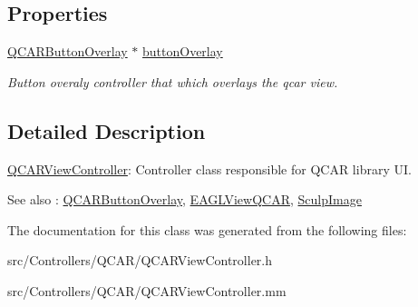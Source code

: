 \subsection*{\-Properties}
\begin{DoxyCompactItemize}
\item 
\hypertarget{interface_q_c_a_r_view_controller_a208c7f5c406cba73be4036a4e34a5715}{
\hyperlink{interface_q_c_a_r_button_overlay}{\-Q\-C\-A\-R\-Button\-Overlay} $\ast$ \hyperlink{interface_q_c_a_r_view_controller_a208c7f5c406cba73be4036a4e34a5715}{button\-Overlay}}
\label{interface_q_c_a_r_view_controller_a208c7f5c406cba73be4036a4e34a5715}

\begin{DoxyCompactList}\small\item\em \-Button overaly controller that which overlays the qcar view. \end{DoxyCompactList}\end{DoxyCompactItemize}


\subsection{\-Detailed \-Description}
\hyperlink{interface_q_c_a_r_view_controller}{\-Q\-C\-A\-R\-View\-Controller}\-: \-Controller class responsible for \-Q\-C\-A\-R library \-U\-I. 

\begin{DoxySeeAlso}{\-See also}
\-: \hyperlink{interface_q_c_a_r_button_overlay}{\-Q\-C\-A\-R\-Button\-Overlay}, \hyperlink{interface_e_a_g_l_view_q_c_a_r}{\-E\-A\-G\-L\-View\-Q\-C\-A\-R}, \hyperlink{interface_sculp_image}{\-Sculp\-Image} 
\end{DoxySeeAlso}


\-The documentation for this class was generated from the following files\-:\begin{DoxyCompactItemize}
\item 
src/\-Controllers/\-Q\-C\-A\-R/\-Q\-C\-A\-R\-View\-Controller.\-h\item 
src/\-Controllers/\-Q\-C\-A\-R/\-Q\-C\-A\-R\-View\-Controller.\-mm\end{DoxyCompactItemize}
